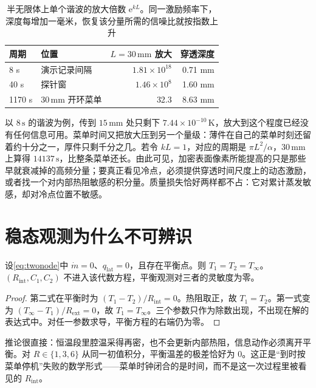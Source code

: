 \begin{table}[htbp]
\centering
\caption{半无限体上单个谐波的放大倍数 \(\mathrm{e}^{kL}\)。同一激励频率下，深度每增加一毫米，恢复该分量所需的信噪比就按指数上升}
\label{tab:amp}
\setlength{\tabcolsep}{2.6pt}
{\footnotesize
\begin{tabular}{llrr}
\toprule
周期 & 位置 & \(L=30\,\mathrm{mm}\) 放大 & 穿透深度 \\
\midrule
8 s & 演示记录间隔 & \(1.81\times 10^{18}\) & 0.71 mm \\
40 s & 探针窗 & \(1.46\times 10^{8}\) & 1.60 mm \\
1170 s & \(30\,\mathrm{mm}\) 开环菜单 & 32.3 & 8.63 mm \\
\bottomrule
\end{tabular}}
\end{table}

以 \(8\,\mathrm{s}\) 的谐波为例，传到 \(15\,\mathrm{mm}\) 处只剩下 \(7.44\times10^{-10}\,\mathrm{K}\)，放大到这个程度已经没有任何信息可用。菜单时间又把放大压到另一个量级：薄件在自己的菜单时刻还留着约十分之一，厚件只剩千分之几。若令 \(kL=1\)，对应的周期是 \(\pi L^2/\alpha\)，\(30\,\mathrm{mm}\) 上算得 \(14137\,\mathrm{s}\)，比整条菜单还长。由此可见，加密表面像素所能提高的只是那些早就衰减掉的高频分量；要真正看见冷点，必须提供穿透时间尺度上的动态激励，或者找一个对内部热阻敏感的积分量。质量损失恰好两样都不占：它对累计蒸发敏感，却对冷点位置不敏感。

\section{稳态观测为什么不可辨识}

\begin{proposition}[平衡点不含内部参数]
\label{prop:steady}
设\eqref{eq:twonode}中 \(\dot m=0\)、\(q_{\mathrm{lat}}=0\)，且存在平衡点。则 \(T_1=T_2=T_\infty\)。\((R_{\mathrm{int}},C_1,C_2)\) 不进入该代数方程，平衡观测对三者的灵敏度为零。
\end{proposition}

\begin{proof}
第二式在平衡时为 \((T_1-T_2)/R_{\mathrm{int}}=0\)。热阻取正，故 \(T_1=T_2\)。第一式变为 \((T_\infty-T_1)/R_{\mathrm{ext}}=0\)，故 \(T_1=T_\infty\)。三个参数只作为除数出现，不出现在解的表达式中。对任一参数求导，平衡方程的右端仍为零。
\end{proof}

推论很直接：恒温段里腔温采得再密，也不会更新内部热阻，信息动作必须离开平衡。对 \(R\in\{1,3,6\}\) 从同一初值积分，平衡温差的极差恰好为 \(0\)。这正是“到时按菜单停机”失败的数学形式——菜单时钟闭合的是时间，而不是这一次过程里被看见的 \(R_{\mathrm{int}}\)。

